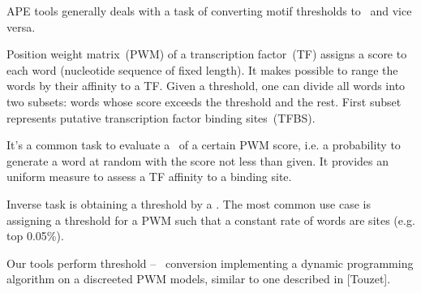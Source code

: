 APE tools generally deals with a task of converting motif thresholds to \pvalues\ and vice versa.

Position weight matrix~(PWM) of a transcription factor~(TF) assigns a score to each word (nucleotide sequence of fixed length). It makes possible to range the words by their affinity to a TF. Given a threshold, one can divide all words into two subsets: words whose score exceeds the threshold and the rest. First subset represents putative transcription factor binding sites~(TFBS).

It's a common task to evaluate a \pvalue\ of a certain PWM score, i.e. a probability to generate a word at random with the score not less than given. It provides an uniform measure to assess a TF affinity to a binding site.

Inverse task is obtaining a threshold by a \pvalue. The most common use case is assigning a threshold for a PWM such that a constant rate of words are sites (e.g. top 0.05\%).

Our tools perform threshold -- \pvalue\ conversion implementing a dynamic programming algorithm on a discreeted PWM models, similar to one described in [Touzet].
